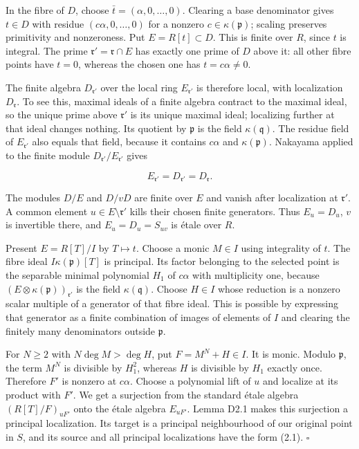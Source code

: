\documentclass[11pt,a4paper,openany]{report}
\begin{document}
In the fibre of \(D\), choose \(\bar t=(\alpha,0,\ldots,0)\). Clearing a base denominator gives \(t\in D\) with residue \((c\alpha,0,\ldots,0)\) for a nonzero \(c\in\kappa(\mathfrak p)\); scaling preserves primitivity and nonzeroness. Put \(E=R[t]\subset D\). This is finite over \(R\), since \(t\) is integral. The prime \(\mathfrak r'=\mathfrak r\cap E\) has exactly one prime of \(D\) above it: all other fibre points have \(t=0\), whereas the chosen one has \(t=c\alpha\ne0\).

The finite algebra \(D_{\mathfrak r'}\) over the local ring \(E_{\mathfrak r'}\) is therefore local, with localization \(D_{\mathfrak r}\). To see this, maximal ideals of a finite algebra contract to the maximal ideal, so the unique prime above \(\mathfrak r'\) is its unique maximal ideal; localizing further at that ideal changes nothing. Its quotient by \(\mathfrak p\) is the field \(\kappa(\mathfrak q)\). The residue field of \(E_{\mathfrak r'}\) also equals that field, because it contains \(c\alpha\) and \(\kappa(\mathfrak p)\). Nakayama applied to the finite module \(D_{\mathfrak r'}/E_{\mathfrak r'}\) gives

\[
E_{\mathfrak r'}=D_{\mathfrak r'}=D_{\mathfrak r}.
\]

The modules \(D/E\) and \(D/vD\) are finite over \(E\) and vanish after localization at \(\mathfrak r'\). A common element \(u\in E\setminus\mathfrak r'\) kills their chosen finite generators. Thus \(E_u=D_u\), \(v\) is invertible there, and \(E_u=D_u=S_{uv}\) is étale over \(R\).

Present \(E=R[T]/I\) by \(T\mapsto t\). Choose a monic \(M\in I\) using integrality of \(t\). The fibre ideal \(I\kappa(\mathfrak p)[T]\) is principal. Its factor belonging to the selected point is the separable minimal polynomial \(H_1\) of \(c\alpha\) with multiplicity one, because \((E\otimes\kappa(\mathfrak p))_{\mathfrak r'}\) is the field \(\kappa(\mathfrak q)\). Choose \(H\in I\) whose reduction is a nonzero scalar multiple of a generator of that fibre ideal. This is possible by expressing that generator as a finite combination of images of elements of \(I\) and clearing the finitely many denominators outside \(\mathfrak p\).

For \(N\ge2\) with \(N\deg M>\deg H\), put \(F=M^N+H\in I\). It is monic. Modulo \(\mathfrak p\), the term \(M^N\) is divisible by \(H_1^2\), whereas \(H\) is divisible by \(H_1\) exactly once. Therefore \(F'\) is nonzero at \(c\alpha\). Choose a polynomial lift of \(u\) and localize at its product with \(F'\). We get a surjection from the standard étale algebra \((R[T]/F)_{uF'}\) onto the étale algebra \(E_{uF'}\). Lemma D2.1 makes this surjection a principal localization. Its target is a principal neighbourhood of our original point in \(S\), and its source and all principal localizations have the form (2.1). \(\square\)
\end{document}
